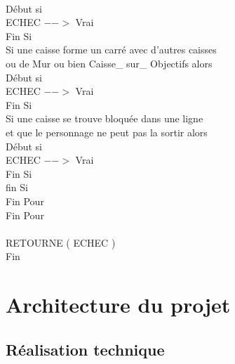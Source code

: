 \documentclass{article}
\begin{document}
\begin{tabbing}
\\	\hspace{4cm}			Début si
\\	\hspace{5cm}				ECHEC $-->$ Vrai
\\	\hspace{4cm}			Fin Si
\\	\hspace{4cm}			Si une caisse forme un carré avec d'autres caisses
\\ \hspace{4cm} ou de Mur ou bien Caisse\_ sur\_ Objectifs alors
\\	\hspace{4cm}			Début si
\\	\hspace{5cm}				ECHEC $-->$ Vrai
\\	\hspace{4cm}			Fin Si
\\	\hspace{4cm}			Si une caisse se trouve bloquée dans une ligne
\\ \hspace{4cm} et que le personnage ne peut pas la sortir alors
\\	\hspace{4cm}			Début si
\\	\hspace{5cm}				ECHEC $-->$ Vrai
\\	\hspace{4cm}			Fin Si
\\	\hspace{3cm}		fin Si
\\	\hspace{2cm}	Fin Pour 
\\	\hspace{1cm} Fin Pour 
\\	
\\	\hspace{1cm} RETOURNE ( ECHEC )
\\Fin
\end{tabbing}
\section{Architecture du projet}
\subsection{Réalisation technique}
\end{document}
